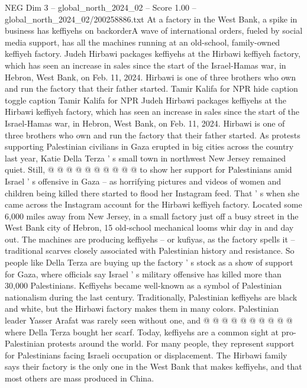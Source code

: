 \begin{textsample}{NEG Dim 3 – global\_north\_2024\_02 – Score 1.00 – global\_north\_2024\_02/200258886.txt}  \label{ex:f3_neg_201}
At a factory in the West Bank, a spike in business has keffiyehs on backorderA wave of international orders, fueled by social media support, has all the machines running at an old-school, family-owned keffiyeh factory.
Judeh Hirbawi packages keffiyehs at the Hirbawi keffiyeh factory, which has seen an increase in sales since the start of the Israel-Hamas war, in Hebron, West Bank, on Feb. 11, 2024.
Hirbawi is one of three brothers who own and run the factory that their father started.
Tamir Kalifa for NPR hide caption toggle caption Tamir Kalifa for NPR Judeh Hirbawi packages keffiyehs at the Hirbawi keffiyeh factory, which has seen an increase in sales since the start of the Israel-Hamas war, in Hebron, West Bank, on Feb. 11, 2024.
Hirbawi is one of three brothers who own and run the factory that their father started.
As protests supporting Palestinian civilians in Gaza erupted in big cities across the country last year, Katie Della Terza ' s small town in northwest New Jersey remained quiet.
Still, @ @ @ @ @ @ @ @ @ @ to show her support for Palestinians amid Israel ' s offensive in Gaza -- as horrifying pictures and videos of women and children being killed there started to flood her Instagram feed.
That ' s when she came across the Instagram account for the Hirbawi keffiyeh factory.
Located some 6,000 miles away from New Jersey, in a small factory just off a busy street in the West Bank city of Hebron, 15 old-school mechanical looms whir day in and day out.
The machines are producing keffiyehs -- or kufiyas, as the factory spells it -- traditional scarves closely associated with Palestinian history and resistance.
So people like Della Terza are buying up the factory ' s stock as a show of support for Gaza, where officials say Israel ' s military offensive has killed more than 30,000 Palestinians.
Keffiyehs became well-known as a symbol of Palestinian nationalism during the last century.
Traditionally, Palestinian keffiyehs are black and white, but the Hirbawi factory makes them in many colors.
Palestinian leader Yasser Arafat was rarely seen without one, and @ @ @ @ @ @ @ @ @ @ where Della Terza bought her scarf.
Today, keffiyehs are a common sight at pro-Palestinian protests around the world.
For many people, they represent support for Palestinians facing Israeli occupation or displacement.
The Hirbawi family says their factory is the only one in the West Bank that makes keffiyehs, and that most others are mass produced in China.

\end{textsample}
